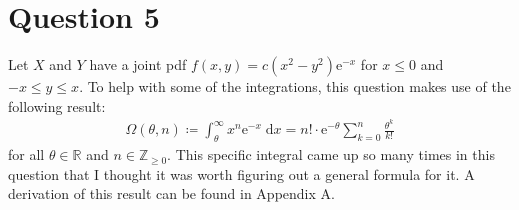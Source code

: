 \documentclass[10pt]{article}
\begin{document}
\section{Question 5} \noindent
Let \(X\) and \(Y\) have a joint pdf \(f(x,y) = c(x^2 - y^2)\mathrm{e}^{-x}\) for \(x \le 0\) and \(-x \le y \le x\).
To help with some of the integrations, this question makes use of the following result:
\begin{align*}
    \Omega(\theta, n) \coloneqq \int_{\theta}^{\infty} x^n \mathrm{e}^{-x} \;\mathrm{d}x = n! \cdot \mathrm{e}^{-\theta} \sum_{k=0}^{n} \frac{\theta^k}{k!}
\end{align*}
for all \(\theta \in \mathbb{R}\) and \(n \in \mathbb{Z}_{\ge0}\). This specific integral came up so many times in this question that 
I thought it was worth figuring out a general formula for it. 
A derivation of this result can be found in Appendix A. 
\end{document}
